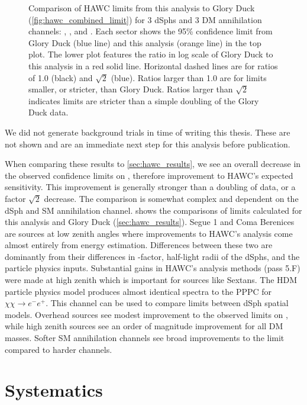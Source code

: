 \begin{figure}[h]
{\begin{tabular}{cccc}
    \end{tabular}
    }
    \caption{Comparison of HAWC limits from this analysis to Glory Duck (\cref{fig:hawc_combined_limit}) for 3 dSphs and 3 DM annihilation channels: , \parpar{\tau}, and . Each sector shows the 95\% confidence limit from Glory Duck (blue line) and this analysis (orange line) in the top plot. The lower plot features the ratio in log scale of Glory Duck to this analysis in a red solid line. Horizontal dashed lines are for ratios of 1.0 (black) and $\sqrt{2}$ (blue). Ratios larger than 1.0 are for limits smaller, or stricter, than Glory Duck. Ratios larger than $\sqrt{2}$ indicates limits are stricter than a simple doubling of the Glory Duck data.}
\label{fig:mtd_compare2gd}
\end{figure}

We did not generate background trials in time of writing this thesis.
These are not shown and are an immediate next step for this analysis before publication.

When comparing these results to \cref{sec:hawc_results}, we see an overall decrease in the observed confidence limits on \sv, therefore improvement to HAWC's expected sensitivity.
This improvement is generally stronger than a doubling of data, or a factor $\sqrt{2}$ decrease.
The comparison is somewhat complex and dependent on the dSph and SM annihilation channel.
 shows the comparisons of limits calculated for this analysis and Glory Duck (\cref{sec:hawc_results}).
Segue 1 and Coma Berenices are sources at low zenith angles where improvements to HAWC's analysis come almost entirely from energy estimation.
Differences between these two are dominantly from their differences in \J-factor, half-light radii of the dSphs, and the particle physics inputs.
Substantial gains in HAWC's analysis methods (pass 5.F) were made at high zenith which is important for sources like Sextans.
The HDM particle physics model produces almost identical spectra to the PPPC for $\chi\chi \rightarrow e^-e^+$.
This channel can be used to compare limits between dSph spatial models.
Overhead sources see modest improvement to the observed limits on \sv, while high zenith sources see an order of magnitude improvement for all DM masses.
Softer SM annihilation channels see broad improvements to the limit compared to harder channels.


\section{Systematics}\label{sec:mtd_systemaics}

